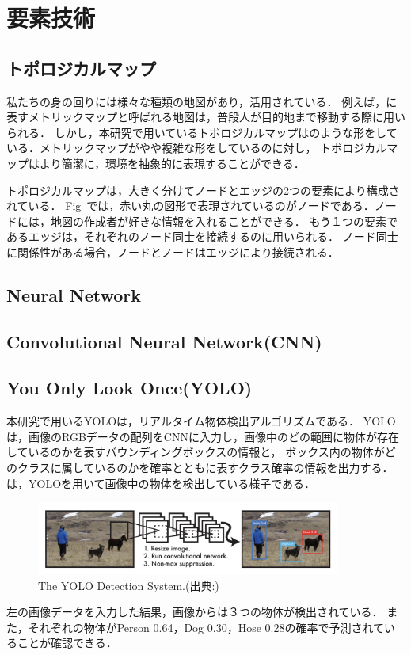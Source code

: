 \documentclass[../main]{subfiles}
\begin{document}
\setcounter{secnumdepth}{4}
    \chapter{要素技術}
        \section{トポロジカルマップ}
        私たちの身の回りには様々な種類の地図があり，活用されている．
        例えば，に表すメトリックマップと呼ばれる地図は，普段人が目的地まで移動する際に用いられる．
        しかし，本研究で用いているトポロジカルマップはのような形をしている．メトリックマップがやや複雑な形をしているのに対し，
        トポロジカルマップはより簡潔に，環境を抽象的に表現することができる．

        
        トポロジカルマップは，大きく分けてノードとエッジの2つの要素により構成されている．
        Fig~では，赤い丸の図形で表現されているのがノードである．ノードには，地図の作成者が好きな情報を入れることができる．
        もう１つの要素であるエッジは，それぞれのノード同士を接続するのに用いられる．
        ノード同士に関係性がある場合，ノードとノードはエッジにより接続される．
    
        \newpage

        \section{Neural Network}
        \section{Convolutional Neural Network(CNN)}

        \newpage
        
        \section{You Only Look Once(YOLO)}
        本研究で用いるYOLO\cite{yolo_paper_fig}は，リアルタイム物体検出アルゴリズムである．
        YOLOは，画像のRGBデータの配列をCNNに入力し，画像中のどの範囲に物体が存在しているのかを表すバウンディングボックスの情報と，
        ボックス内の物体がどのクラスに属しているのかを確率とともに表すクラス確率の情報を出力する．
        は，YOLOを用いて画像中の物体を検出している様子である． 

        \begin{figure}[H]
        \centering
        \includegraphics[width=10cm]{../images/yolo_exp.png}
        \caption{The YOLO Detection System.(出典:)}
        \label{figure::yolo_exp}
        \end{figure}
        左の画像データを入力した結果，画像からは３つの物体が検出されている．
        また，それぞれの物体がPerson 0.64，Dog 0.30，Hose 0.28の確率で予測されていることが確認できる．
    
\end{document}
